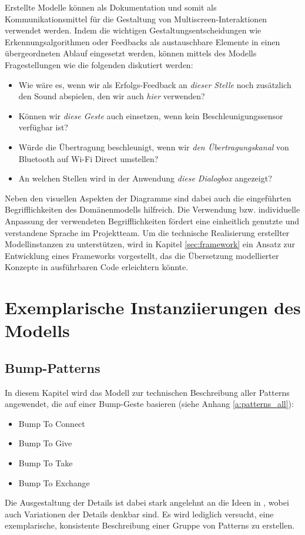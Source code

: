 Erstellte Modelle können als Dokumentation und somit als Kommunikationsmittel für die Gestaltung von Multiscreen-Interaktionen verwendet werden. Indem die wichtigen Gestaltungsentscheidungen wie Erkennungsalgorithmen oder Feedbacks als austauschbare Elemente in einen übergeordneten Ablauf eingesetzt werden, können mittels des Modells Fragestellungen wie die folgenden diskutiert werden:
\begin{itemize}
\item Wie wäre es, wenn wir als Erfolgs-Feedback an \textit{dieser Stelle} noch zusätzlich den Sound abspielen, den wir auch \textit{hier} verwenden?
\item Können wir \textit{diese Geste} auch einsetzen, wenn kein Beschleunigungssensor verfügbar ist?
\item Würde die Übertragung beschleunigt, wenn wir \textit{den Übertragungskanal} von Bluetooth auf Wi-Fi Direct umstellen?
\item An welchen Stellen wird in der Anwendung \textit{diese Dialogbox} angezeigt?
\end{itemize}
Neben den visuellen Aspekten der Diagramme sind dabei auch die eingeführten Begrifflichkeiten des Domänenmodells hilfreich. Die Verwendung bzw. individuelle Anpassung der verwendeten Begrifflichkeiten fördert eine einheitlich genutzte und verstandene Sprache im Projektteam. Um die technische Realisierung erstellter Modellinstanzen zu unterstützen, wird in Kapitel \ref{sec:framework} ein Ansatz zur Entwicklung eines Frameworks vorgestellt, das die Übersetzung modellierter Konzepte in ausführbaren Code erleichtern könnte.

\section{Exemplarische Instanziierungen des Modells}
\subsection{Bump-Patterns}
\label{subsec:bump_validation}
In diesem Kapitel wird das Modell zur technischen Beschreibung aller Patterns angewendet, die auf einer Bump-Geste basieren (siehe Anhang \ref{a:patterns_all}):
\begin{itemize}
\item Bump To Connect
\item Bump To Give
\item Bump To Take
\item Bump To Exchange
\end{itemize}
Die Ausgestaltung der Details ist dabei stark angelehnt an die Ideen in \citep{Hinckley2003}, wobei auch Variationen der Details denkbar sind. Es wird lediglich versucht, eine exemplarische, konsistente Beschreibung einer Gruppe von Patterns zu erstellen.

